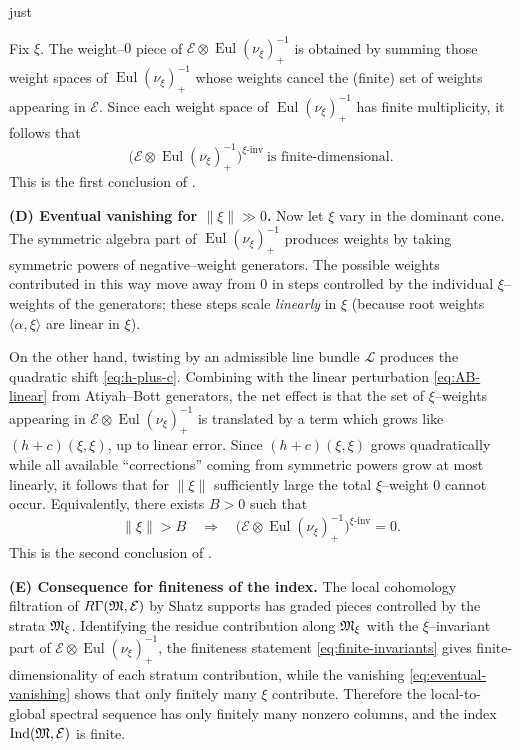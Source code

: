 just \documentclass[12pt]{article}
\DeclareMathOperator{\Eul}{Eul}
\DeclareMathOperator{\Ind}{Ind}
\begin{document}
Fix $\xi$.  The weight--$0$ piece of
$\mathcal E\otimes \Eul(\nu_\xi)^{-1}_+$
is obtained by summing those weight spaces of $\Eul(\nu_\xi)^{-1}_+$ whose weights
cancel the (finite) set of weights appearing in $\mathcal E$.  Since each weight
space of $\Eul(\nu_\xi)^{-1}_+$ has finite multiplicity, it follows that
\begin{equation}
\label{eq:finite-invariants}
\bigl(\mathcal E\otimes \Eul(\nu_\xi)^{-1}_+\bigr)^{\xi\text{-inv}}
\ \text{is finite-dimensional.}
\end{equation}
This is the first conclusion of \cite[\S1.11]{TelemanWoodward}.

\medskip
\noindent\textbf{(D) Eventual vanishing for $\|\xi\|\gg 0$.}
Now let $\xi$ vary in the dominant cone.  The symmetric algebra part of
$\Eul(\nu_\xi)^{-1}_+$ produces weights by taking symmetric powers of
negative--weight generators.  The possible weights contributed in this way move
away from $0$ in steps controlled by the individual $\xi$--weights of the
generators; these steps scale \emph{linearly} in $\xi$ (because root weights
$\langle\alpha,\xi\rangle$ are linear in $\xi$).

On the other hand, twisting by an admissible line bundle $\mathcal L$ produces
the quadratic shift \eqref{eq:h-plus-c}.  Combining with the linear perturbation
\eqref{eq:AB-linear} from Atiyah--Bott generators, the net effect is that the set
of $\xi$--weights appearing in
$\mathcal E\otimes \Eul(\nu_\xi)^{-1}_+$
is translated by a term which grows like $(h+c)(\xi,\xi)$, up to linear error.
Since $(h+c)(\xi,\xi)$ grows quadratically while all available ``corrections''
coming from symmetric powers grow at most linearly, it follows that for $\|\xi\|$
sufficiently large the total $\xi$--weight $0$ cannot occur.  Equivalently, there
exists $B>0$ such that
\begin{equation}
\label{eq:eventual-vanishing}
\|\xi\|>B \quad\Longrightarrow\quad
\bigl(\mathcal E\otimes \Eul(\nu_\xi)^{-1}_+\bigr)^{\xi\text{-inv}}=0.
\end{equation}
This is the second conclusion of \cite[\S1.11]{TelemanWoodward}.

\medskip
\noindent\textbf{(E) Consequence for finiteness of the index.}
The local cohomology filtration of $R\Gamma(\mathfrak{M},\mathcal E)$ by Shatz supports
has graded pieces controlled by the strata $\mathfrak{M}_\xi$.
Identifying the residue contribution along $\mathfrak{M}_\xi$ with the $\xi$--invariant
part of $\mathcal E\otimes \Eul(\nu_\xi)^{-1}_+$, the finiteness statement
\eqref{eq:finite-invariants} gives finite-dimensionality of each stratum
contribution, while the vanishing \eqref{eq:eventual-vanishing} shows that only
finitely many $\xi$ contribute.  Therefore the local-to-global spectral sequence
has only finitely many nonzero columns, and the index $\Ind(\mf M,\mathcal E)$ is
finite.
\end{document}
